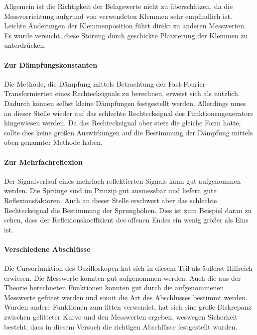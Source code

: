 Allgemein ist die Richtigkeit der Belagswerte nicht zu überschätzen, da
die Messvorrichtung aufgrund von verwendeten Klemmen sehr empfindlich
ist. Leichte Änderungen der Klemmenposition führt direkt zu anderen
Messwerten. Es wurde versucht, diese Störung durch geschickte
Platzierung der Klemmen zu unterdrücken.

\paragraph{Zur Dämpfungskonstanten}
Die Methode, die Dämpfung mittels Betrachtung der
Fast-Fourier-Transformierten eines Rechtecksignals zu berechnen, erweist
sich als nützlich. Dadurch können selbst kleine Dämpfungen festgestellt
werden.  Allerdings muss an dieser Stelle wieder auf das schlechte
Rechtecksignal des Funktionengenerators hingewiesen werden.  Da das
Rechtecksignal aber stets die gleiche Form hatte, sollte dies keine
großen Auswirkungen auf die Bestimmung der Dämpfung mittels oben
genannter Methode haben.

\paragraph{Zur Mehrfachreflexion}
Der Signalverlauf eines mehrfach reflektierten Signals kann gut
aufgenommen werden. Die Sprünge sind im Prinzip gut ausmessbar und
liefern gute Reflexionsfaktoren.  Auch an dieser Stelle erschwert aber
das schlechte Rechtecksignal die Bestimmung der Sprunghöhen. Dies ist
zum Beispiel daran zu sehen, dass der Reflexionskoeffizient des offenen
Endes ein wenig größer als Eins ist.

\paragraph{Verschiedene Abschlüsse}
Die Cursorfunktion des Oszilloskopen hat sich in diesem Teil als äußerst
Hilfreich erwiesen. Die Messwerte konnten gut aufgenommen werden. Auch
die aus der Theorie berechneten Funktionen konnten gut durch die
aufgenommenen Messwerte gefittet werden und somit die Art des
Abschlusses bestimmt werden.  Wurden andere Funktionen zum fitten
verwendet, hat sich eine große Diskrepanz zwischen gefitteter Kurve und
den Messwerten ergeben, weswegen Sicherheit besteht, dass in diesem
Versuch die richtigen Abschlüsse festgestellt wurden.
